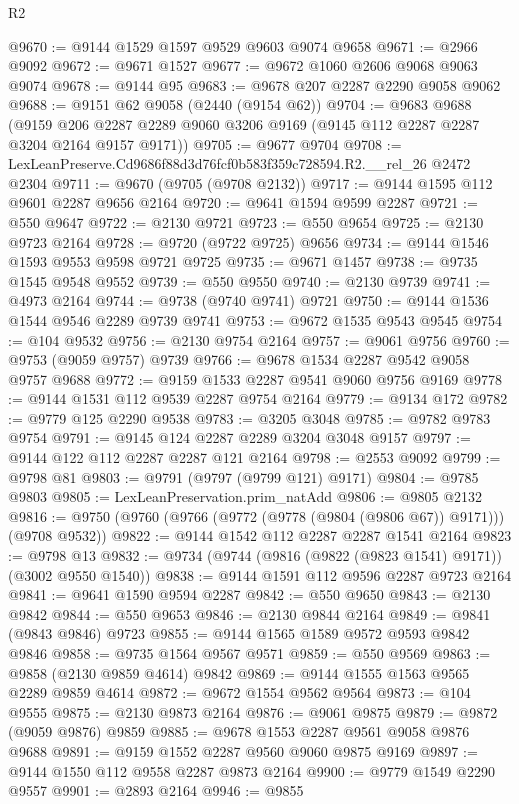 \begin{lexlean}{R2}
\begin{coremodule}
@9670 := @9144 @1529 @1597 @9529 @9603 @9074 @9658
@9671 := @2966 @9092
@9672 := @9671 @1527
@9677 := @9672 @1060 @2606 @9068 @9063 @9074
@9678 := @9144 @95
@9683 := @9678 @207 @2287 @2290 @9058 @9062
@9688 := @9151 @62 @9058 (@2440 (@9154 @62))
@9704 := @9683
    @9688
    (@9159 @206 @2287 @2289 @9060 @3206 @9169 (@9145 @112 @2287 @2287 @3204 @2164 @9157 @9171))
@9705 := @9677 @9704
@9708 := LexLeanPreserve.Cd9686f88d3d76fcf0b583f359c728594.R2.__rel_26 @2472 @2304
@9711 := @9670 (@9705 (@9708 @2132))
@9717 := @9144 @1595 @112 @9601 @2287 @9656 @2164
@9720 := @9641 @1594 @9599 @2287
@9721 := @550 @9647
@9722 := @2130 @9721
@9723 := @550 @9654
@9725 := @2130 @9723 @2164
@9728 := @9720 (@9722 @9725) @9656
@9734 := @9144 @1546 @1593 @9553 @9598 @9721 @9725
@9735 := @9671 @1457
@9738 := @9735 @1545 @9548 @9552
@9739 := @550 @9550
@9740 := @2130 @9739
@9741 := @4973 @2164
@9744 := @9738 (@9740 @9741) @9721
@9750 := @9144 @1536 @1544 @9546 @2289 @9739 @9741
@9753 := @9672 @1535 @9543 @9545
@9754 := @104 @9532
@9756 := @2130 @9754 @2164
@9757 := @9061 @9756
@9760 := @9753 (@9059 @9757) @9739
@9766 := @9678 @1534 @2287 @9542 @9058 @9757 @9688
@9772 := @9159 @1533 @2287 @9541 @9060 @9756 @9169
@9778 := @9144 @1531 @112 @9539 @2287 @9754 @2164
@9779 := @9134 @172
@9782 := @9779 @125 @2290 @9538
@9783 := @3205 @3048
@9785 := @9782 @9783 @9754
@9791 := @9145 @124 @2287 @2289 @3204 @3048 @9157
@9797 := @9144 @122 @112 @2287 @2287 @121 @2164
@9798 := @2553 @9092
@9799 := @9798 @81
@9803 := @9791 (@9797 (@9799 @121) @9171)
@9804 := @9785 @9803
@9805 := LexLeanPreservation.prim_natAdd
@9806 := @9805 @2132
@9816 := @9750 (@9760 (@9766 (@9772 (@9778 (@9804 (@9806 @67)) @9171))) (@9708 @9532))
@9822 := @9144 @1542 @112 @2287 @2287 @1541 @2164
@9823 := @9798 @13
@9832 := @9734 (@9744 (@9816 (@9822 (@9823 @1541) @9171)) (@3002 @9550 @1540))
@9838 := @9144 @1591 @112 @9596 @2287 @9723 @2164
@9841 := @9641 @1590 @9594 @2287
@9842 := @550 @9650
@9843 := @2130 @9842
@9844 := @550 @9653
@9846 := @2130 @9844 @2164
@9849 := @9841 (@9843 @9846) @9723
@9855 := @9144 @1565 @1589 @9572 @9593 @9842 @9846
@9858 := @9735 @1564 @9567 @9571
@9859 := @550 @9569
@9863 := @9858 (@2130 @9859 @4614) @9842
@9869 := @9144 @1555 @1563 @9565 @2289 @9859 @4614
@9872 := @9672 @1554 @9562 @9564
@9873 := @104 @9555
@9875 := @2130 @9873 @2164
@9876 := @9061 @9875
@9879 := @9872 (@9059 @9876) @9859
@9885 := @9678 @1553 @2287 @9561 @9058 @9876 @9688
@9891 := @9159 @1552 @2287 @9560 @9060 @9875 @9169
@9897 := @9144 @1550 @112 @9558 @2287 @9873 @2164
@9900 := @9779 @1549 @2290 @9557
@9901 := @2893 @2164
@9946 := @9855

\end{coremodule}
\end{lexlean}
